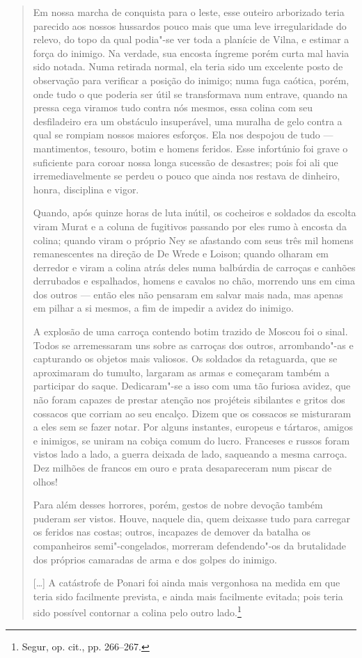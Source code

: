 \begin{quote}
Em nossa marcha de conquista para o leste, esse outeiro arborizado teria
parecido aos nossos hussardos pouco mais que uma leve irregularidade do
relevo, do topo da qual podia"-se ver toda a planície de Vilna, e estimar
a força do inimigo. Na verdade, sua encosta íngreme porém curta mal
havia sido notada. Numa retirada normal, ela teria sido um excelente
posto de observação para verificar a posição do inimigo; numa fuga
caótica, porém, onde tudo o que poderia ser útil se transformava num
entrave, quando na pressa cega viramos tudo contra nós mesmos, essa
colina com seu desfiladeiro era um obstáculo insuperável, uma muralha de
gelo contra a qual se rompiam nossos maiores esforços. Ela nos despojou
de tudo --- mantimentos, tesouro, botim e homens feridos. Esse infortúnio
foi grave o suficiente para coroar nossa longa sucessão de desastres;
pois foi ali que irremediavelmente se perdeu o pouco que ainda nos
restava de dinheiro, honra, disciplina e vigor.

Quando, após quinze horas de luta inútil, os cocheiros e soldados da
escolta viram Murat e a coluna de fugitivos passando por eles rumo à
encosta da colina; quando viram o próprio Ney se afastando com seus três
mil homens remanescentes na direção de De Wrede e Loison; quando olharam
em derredor e viram a colina atrás deles numa balbúrdia de carroças e
canhões derrubados e espalhados, homens e cavalos no chão, morrendo uns
em cima dos outros --- então eles não pensaram em salvar mais nada, mas
apenas em pilhar a si mesmos, a fim de impedir a avidez do inimigo.

A explosão de uma carroça contendo botim trazido de Moscou foi o sinal.
Todos se arremessaram uns sobre as carroças dos outros, arrombando"-as e
capturando os objetos mais valiosos. Os soldados da retaguarda, que se
aproximaram do tumulto, largaram as armas e começaram também a
participar do saque. Dedicaram"-se a isso com uma tão furiosa avidez, que
não foram capazes de prestar atenção nos projéteis sibilantes e gritos
dos cossacos que corriam ao seu encalço. Dizem que os cossacos se
misturaram a eles sem se fazer notar. Por alguns instantes, europeus e
tártaros, amigos e inimigos, se uniram na cobiça comum do lucro.
Franceses e russos foram vistos lado a lado, a guerra deixada de lado,
saqueando a mesma carroça. Dez milhões de francos em ouro e prata
desapareceram num piscar de olhos!

Para além desses horrores, porém, gestos de nobre devoção também puderam
ser vistos. Houve, naquele dia, quem deixasse tudo para carregar os
feridos nas costas; outros, incapazes de demover da batalha os
companheiros semi"-congelados, morreram defendendo"-os da brutalidade dos
próprios camaradas de arma e dos golpes do inimigo.

[\ldots{}] A catástrofe de Ponari foi ainda mais vergonhosa na medida em
que teria sido facilmente prevista, e ainda mais facilmente evitada;
pois teria sido possível contornar a colina pelo outro lado.\footnote{Segur, op. cit., pp. 266--267.} 
\end{quote}

